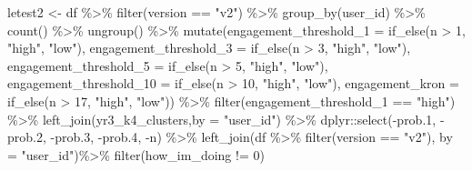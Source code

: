 \documentclass[
]{article}
\newenvironment{Shaded}{\begin{snugshade}}{\end{snugshade}}
\newcommand{\AttributeTok}[1]{\textcolor[rgb]{0.77,0.63,0.00}{#1}}
\newcommand{\DecValTok}[1]{\textcolor[rgb]{0.00,0.00,0.81}{#1}}
\newcommand{\FloatTok}[1]{\textcolor[rgb]{0.00,0.00,0.81}{#1}}
\newcommand{\FunctionTok}[1]{\textcolor[rgb]{0.00,0.00,0.00}{#1}}
\newcommand{\NormalTok}[1]{#1}
\newcommand{\OtherTok}[1]{\textcolor[rgb]{0.56,0.35,0.01}{#1}}
\newcommand{\SpecialCharTok}[1]{\textcolor[rgb]{0.00,0.00,0.00}{#1}}
\newcommand{\StringTok}[1]{\textcolor[rgb]{0.31,0.60,0.02}{#1}}
\begin{document}
\begin{Shaded}
\begin{Highlighting}[]
\NormalTok{letest2 }\OtherTok{\textless{}{-}}\NormalTok{  df }\SpecialCharTok{\%\textgreater{}\%}
  \FunctionTok{filter}\NormalTok{(version }\SpecialCharTok{==} \StringTok{"v2"}\NormalTok{) }\SpecialCharTok{\%\textgreater{}\%}
  \FunctionTok{group\_by}\NormalTok{(user\_id) }\SpecialCharTok{\%\textgreater{}\%}
  \FunctionTok{count}\NormalTok{() }\SpecialCharTok{\%\textgreater{}\%}
  \FunctionTok{ungroup}\NormalTok{() }\SpecialCharTok{\%\textgreater{}\%} 
  \FunctionTok{mutate}\NormalTok{(}\AttributeTok{engagement\_threshold\_1 =} \FunctionTok{if\_else}\NormalTok{(n }\SpecialCharTok{\textgreater{}} \DecValTok{1}\NormalTok{, }\StringTok{"high"}\NormalTok{, }\StringTok{"low"}\NormalTok{),}
         \AttributeTok{engagement\_threshold\_3 =} \FunctionTok{if\_else}\NormalTok{(n }\SpecialCharTok{\textgreater{}} \DecValTok{3}\NormalTok{, }\StringTok{"high"}\NormalTok{, }\StringTok{"low"}\NormalTok{),}
         \AttributeTok{engagement\_threshold\_5 =} \FunctionTok{if\_else}\NormalTok{(n }\SpecialCharTok{\textgreater{}} \DecValTok{5}\NormalTok{, }\StringTok{"high"}\NormalTok{, }\StringTok{"low"}\NormalTok{),}
         \AttributeTok{engagement\_threshold\_10 =} \FunctionTok{if\_else}\NormalTok{(n }\SpecialCharTok{\textgreater{}} \DecValTok{10}\NormalTok{, }\StringTok{"high"}\NormalTok{, }\StringTok{"low"}\NormalTok{),}
         \AttributeTok{engagement\_kron =} \FunctionTok{if\_else}\NormalTok{(n }\SpecialCharTok{\textgreater{}} \DecValTok{17}\NormalTok{, }\StringTok{"high"}\NormalTok{, }\StringTok{"low"}\NormalTok{)) }\SpecialCharTok{\%\textgreater{}\%} 
  \FunctionTok{filter}\NormalTok{(engagement\_threshold\_1 }\SpecialCharTok{==} \StringTok{"high"}\NormalTok{) }\SpecialCharTok{\%\textgreater{}\%} 
  \FunctionTok{left\_join}\NormalTok{(yr3\_k4\_clusters,}\AttributeTok{by =} \StringTok{"user\_id"}\NormalTok{) }\SpecialCharTok{\%\textgreater{}\%} 
\NormalTok{  dplyr}\SpecialCharTok{::}\FunctionTok{select}\NormalTok{(}\SpecialCharTok{{-}}\NormalTok{prob}\FloatTok{.1}\NormalTok{,}
          \SpecialCharTok{{-}}\NormalTok{prob}\FloatTok{.2}\NormalTok{,}
          \SpecialCharTok{{-}}\NormalTok{prob}\FloatTok{.3}\NormalTok{,}
          \SpecialCharTok{{-}}\NormalTok{prob}\FloatTok{.4}\NormalTok{,}
          \SpecialCharTok{{-}}\NormalTok{n) }\SpecialCharTok{\%\textgreater{}\%} 
  \FunctionTok{left\_join}\NormalTok{(df }\SpecialCharTok{\%\textgreater{}\%} 
  \FunctionTok{filter}\NormalTok{(version }\SpecialCharTok{==} \StringTok{"v2"}\NormalTok{),}
         \AttributeTok{by =} \StringTok{"user\_id"}\NormalTok{)}\SpecialCharTok{\%\textgreater{}\%}
  \FunctionTok{filter}\NormalTok{(how\_im\_doing }\SpecialCharTok{!=} \DecValTok{0}\NormalTok{)}



\end{Highlighting}
\end{Shaded}
\end{document}
